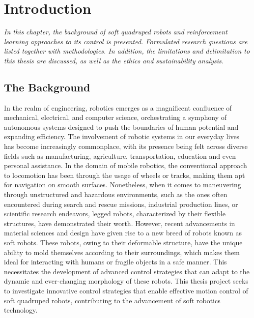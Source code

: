 \chapter{Introduction}
\label{chap1}
\textit{In this chapter, the background of soft quadruped robots and reinforcement learning approaches to its control is presented. Formulated research questions are listed together with methodologies. In addition, the limitations and delimitation to this thesis are discussed, as well as the ethics and sustainability analysis.}

\section{The Background}
In the realm of engineering, robotics emerges as a magnificent confluence of mechanical, electrical, and computer science, orchestrating a symphony of autonomous systems designed to push the boundaries of human potential and expanding efficiency\cite{billardTrendsChallengesRobot2019}. The involvement of robotic systems in our everyday lives has become increasingly commonplace, with its presence being felt across diverse fields such as manufacturing\cite{wangCurrentResearchesFuture2018}, agriculture\cite{liDevelopmentFieldEvaluation2023}, transportation\cite{zhangFindingCriticalScenarios2023}, education\cite{riedoThymioIIRobot2013} and even personal assistance\cite{openaiGPT4TechnicalReport2023}. In the domain of mobile robotics, the conventional approach to locomotion has been through the usage of wheels or tracks, making them apt for navigation on smooth surfaces\cite{liResearchMammalBionic2011}. Nonetheless, when it comes to maneuvering through unstructured and hazardous environments, such as the ones often encountered during search and rescue missions\cite{hawkesSoftRobotThat2017}, industrial production lines\cite{huDesignQuadrupedInspection2021}, or scientific research endeavors\cite{hewingLearningbasedModelPredictive2020}, legged robots, characterized by their flexible structures, have demonstrated their worth. However, recent advancements in material sciences and design have given rise to a new breed of robots known as soft robots. These robots, owing to their deformable structure, have the unique ability to mold themselves according to their surroundings, which makes them ideal for interacting with humans or fragile objects in a safe manner\cite{muralidharanSoftQuadrupedRobot2021}. This necessitates the development of advanced control strategies that can adapt to the dynamic and ever-changing morphology of these robots\cite{wangControlStrategiesSoft2022}. This thesis project seeks to investigate innovative control strategies that enable effective motion control of soft quadruped robots, contributing to the advancement of soft robotics technology.
